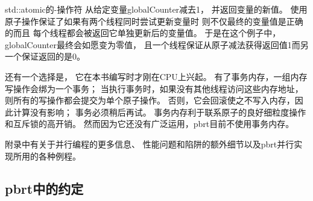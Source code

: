 {\ttfamily std::atomic}的{\ttfamily -}操作符
从给定变量{\ttfamily globalCounter}减去1，
并返回变量的新值。
使用原子操作保证了如果有两个线程同时尝试更新变量时
则不仅最终的变量值是正确的而且
每个线程都会被返回它单独更新后的变量值。
于是在这个例子中，{\ttfamily globalCounter}最终会如愿变为零值，
且一个线程保证从原子减法获得返回值1而另一个保证返回的是0。

还有一个选择是，
它在本书编写时才刚在CPU上兴起。
有了事务内存，一组内存写操作会绑为一个事务；
当执行事务时，如果没有其他线程访问这些内存地址，
则所有的写操作都会提交为单个原子操作。
否则，它会回滚使之不写入内存，因此计算没有影响；
事务必须稍后再试。
事务内存利于联系原子的良好细粒度操作和互斥锁的高开销。
然而因为它还没有广泛运用，pbrt目前不使用事务内存。

附录中有关于并行编程的更多信息、
性能问题和陷阱的额外细节以及pbrt并行实现所用的各种例程。

\subsection{pbrt中的约定}\label{sub:pbrt中的约定}